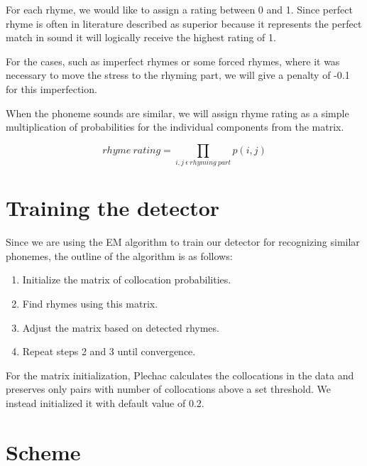  For each rhyme, we would like to assign a rating between 0 and 1. Since perfect rhyme is often in literature described as superior because it represents the perfect match in sound it will logically receive the highest rating of 1.
 
 For the cases, such as imperfect rhymes or some forced rhymes, where it was necessary to move the stress to the rhyming part, we will give a penalty of -0.1 for this imperfection. 
 
	When the phoneme sounds are similar, we will assign rhyme rating as a simple multiplication of probabilities for the individual components from the matrix.
	
	\[rhyme\ rating = \prod_{i,j\ \epsilon\ rhyming\ part} p(i,j) \]


\section{Training the detector}
Since we are using the EM algorithm to train our detector for recognizing similar phonemes, the outline of the algorithm is as follows:
\begin{enumerate}
	\item Initialize the matrix of collocation probabilities.
	\item Find rhymes using this matrix.
	\item Adjust the matrix based on detected rhymes.
	\item Repeat steps 2 and 3 until convergence.
\end{enumerate} 

For the matrix initialization, Plechac calculates the collocations in the data and preserves only pairs with number of collocations above a set threshold. We instead initialized it with default value of 0.2. 

\paragraph{}

\section{Scheme}
